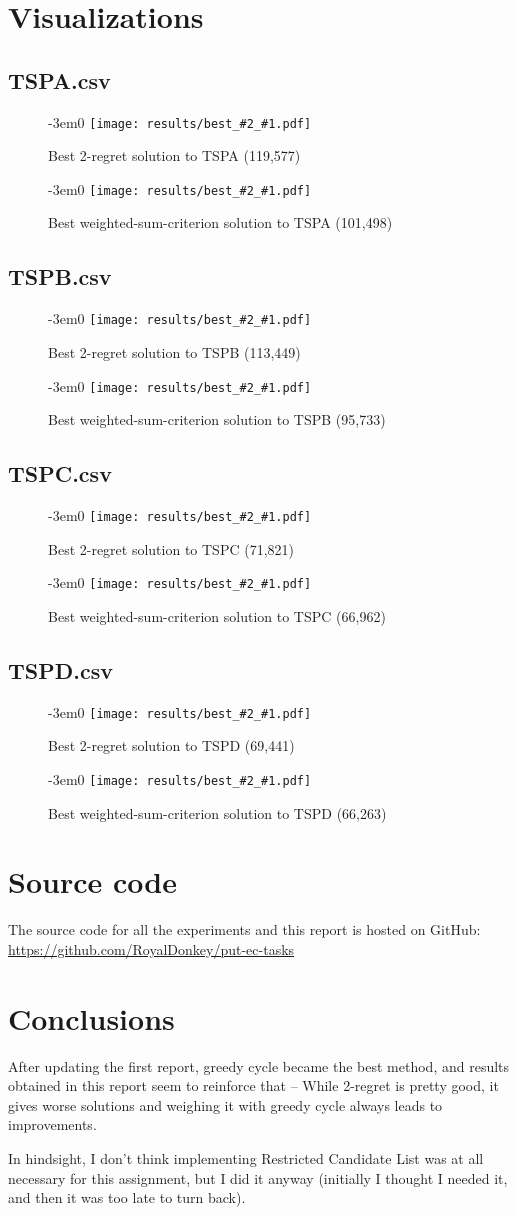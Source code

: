 \documentclass[14pt]{article}
\begin{document}
\section{Visualizations}

\newcommand{\visualization}[3]{%
\begin{figure}[H]%
	\begin{adjustwidth}{-3em}{0}%
		\texttt{[image: results/best\_\#2\_\#1.pdf]}%
	\end{adjustwidth}%
	\vspace{-15mm}%
	\caption{Best #2 solution to #1 (#3)}%
\end{figure}%
}

\subsection{TSPA.csv}
\vspace{-15mm}
\visualization{TSPA}{2-regret}{119,577}
\visualization{TSPA}{weighted-sum-criterion}{101,498}

\subsection{TSPB.csv}
\vspace{-15mm}
\visualization{TSPB}{2-regret}{113,449}
\visualization{TSPB}{weighted-sum-criterion}{95,733}

\subsection{TSPC.csv}
\vspace{-15mm}
\visualization{TSPC}{2-regret}{71,821}
\visualization{TSPC}{weighted-sum-criterion}{66,962}

\subsection{TSPD.csv}
\vspace{-15mm}
\visualization{TSPD}{2-regret}{69,441}
\visualization{TSPD}{weighted-sum-criterion}{66,263}

\section{Source code}
The source code for all the experiments and this report is hosted on GitHub: \\
\url{https://github.com/RoyalDonkey/put-ec-tasks}

\section{Conclusions}
After updating the first report, greedy cycle became the best method, and
results obtained in this report seem to reinforce that -- While 2-regret is
pretty good, it gives worse solutions and weighing it with greedy cycle always
leads to improvements.

In hindsight, I don't think implementing Restricted Candidate List was at all
necessary for this assignment, but I did it anyway (initially I thought I
needed it, and then it was too late to turn back).
\end{document}
